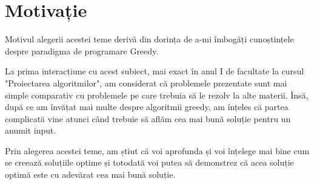\chapter*{Motivație} 

Motivul alegerii acestei teme derivă din dorința de a-mi îmbogăți cunoștințele despre paradigma de programare Greedy. \par La prima interacțiune cu acest subiect, mai exact în anul I de facultate la cursul "Proiectarea algoritmilor", am considerat că problemele prezentate sunt mai simple comparativ cu problemele pe care  trebuia să le rezolv la alte materii. 
Însă, după ce am învățat mai multe despre algoritmii greedy, am înțeles că partea complicată vine atunci când trebuie să aflăm cea mai bună soluție pentru un anumit input. \par 
Prin  alegerea acestei teme, am știut că voi aprofunda și voi înțelege mai bine cum se creează soluțiile optime și totodată voi putea să demonstrez că acea soluție optimă este cu adevărat cea mai bună soluție. 